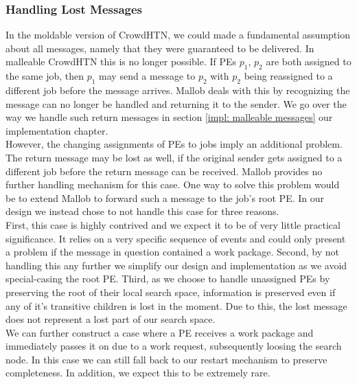 \subsubsection{Handling Lost Messages}
In the moldable version of CrowdHTN, we could made a fundamental assumption about all messages, namely that they were guaranteed to be delivered. In malleable CrowdHTN this is no longer possible. If PEs $p_1$, $p_2$ are both assigned to the same job, then $p_1$ may send a message to $p_2$ with $p_2$ being reassigned to a different job before the message arrives. Mallob deals with this by recognizing the message can no longer be handled and returning it to the sender. We go over the way we handle such return messages in section \ref{impl: malleable messages} our implementation chapter. \\
However, the changing assignments of PEs to jobs imply an additional problem. The return message may be lost as well, if the original sender gets assigned to a different job before the return message can be received. Mallob provides no further handling mechanism for this case. One way to solve this problem would be to extend Mallob to forward such a message to the job's root PE. In our design we instead chose to not handle this case for three reasons. \\
First, this case is highly contrived and we expect it to be of very little practical significance. It relies on a very specific sequence of events and could only present a problem if the message in question contained a work package. Second, by not handling this any further we simplify our design and implementation as we avoid special-casing the root PE. Third, as we choose to handle unassigned PEs by preserving the root of their local search space, information is preserved even if any of it's transitive children is lost in the moment. Due to this, the lost message does not represent a lost part of our search space. \\
We can further construct a case where a PE receives a work package and immediately passes it on due to a work request, subsequently loosing the search node. In this case we can still fall back to our restart mechanism to preserve completeness. In addition, we expect this to be extremely rare.
